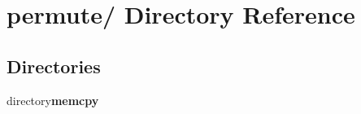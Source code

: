 \section{permute/ Directory Reference}
\label{dir_000009}
\subsection*{Directories}
\begin{CompactItemize}
\item 
directory{\bf memcpy}
\end{CompactItemize}
